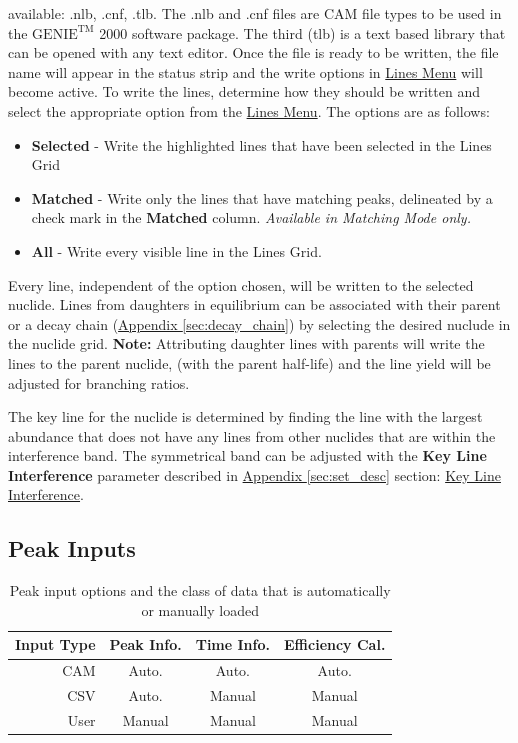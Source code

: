 \documentclass[12pt,report,justified]{SANDreport}
\begin{document}
available: .nlb, .cnf, .tlb. The .nlb and .cnf files are CAM file types to be used in the \(\text{GENIE}^\text{TM}\)
2000 software package. The third (tlb) is a text based library that can be opened with any text editor. Once the
file is ready to be written, the file name will appear in the status strip and the write options in
\hyperref[sec:line_menu]{Lines Menu} will become active. To write the lines, determine how they should be written
and select the appropriate option from the \hyperref[sec:line_menu]{Lines Menu}. The options are as follows:
\begin{itemize}
    \item \textbf{Selected} - Write the highlighted lines that have been selected in the Lines Grid
    \item \textbf{Matched} -  Write only the lines that have matching peaks, delineated by a check mark in the
    \textbf{Matched} column. \textit{Available in Matching Mode only.}
    \item \textbf{All} - Write every visible line in the Lines Grid.
\end{itemize}

Every line, independent of the option chosen, will be written to the selected nuclide. Lines from daughters
in equilibrium can be associated with their parent or a decay chain
(\hyperref[sec:decay_chain]{Appendix \ref{sec:decay_chain}}) by selecting the desired
nuclude in the nuclide grid. \textbf{Note:} Attributing daughter lines with parents will write the lines to the
parent nuclide, (with the parent half-life) and the line yield will be adjusted for branching ratios.

The key line for the nuclide is determined by finding the line with the largest abundance that does
not have any lines from other nuclides that are within the interference band. The symmetrical band
can be adjusted with the \textbf{Key Line Interference} parameter described in
\hyperref[sec:set_desc]{Appendix \ref{sec:set_desc}} section:
\hyperref[itm:ky_inf]{Key Line Interference}.

\subsection{Peak Inputs}\label{sec:peak_inp}
\begin{table}[h!]
    \centering
    \caption{Peak input options and the class of data that is automatically or manually loaded}
    \begin{tabular} {r|c|c|c}
        \hline
        Input Type & Peak Info. & Time Info. & Efficiency Cal. \\
        \hline
        CAM & Auto. & Auto. & Auto.\\
        CSV & Auto. & Manual & Manual \\
        User & Manual & Manual & Manual \\
        \hline
    \end{tabular}
   \label{tab:peak_inp}
\end{table}
\end{document}
